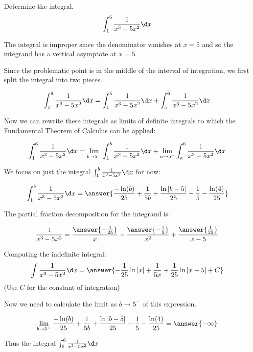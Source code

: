 \documentclass{ximera}
\author{Jason Miller}
\begin{document}
\begin{exercise}
Determine the integral.
\[
\int_{1}^{6} \frac{1}{x^3-5x^2} \d x
\]

The integral is improper since the denominator vanishes at $x=5$ and so the integrand has a vertical asymptote at $x=5$. 

Since the problematic point is in the middle of the interval of integration, we first split the integral into two pieces. 

\[
\int _{1}^{6} \frac{1}{x^3-5x^2} \d x=\int_{1}^{5} \frac{1}{x^3-5x^2} \d x + \int_{5}^{6} \frac{1}{x^3-5x^2} \d x
\]

Now we can rewrite these integrals as limits of definite integrals to which the Fundamental Theorem of Calculus can be applied: 

\[
\int_{1}^{6} \frac{1}{x^3-5x^2} \d x= \lim_{b \to 5^{-}} \int_{1}^{b} \frac{1}{x^3-5x^2} \d x + \lim_{a \to 5^{+}} \int _{a}^{6} 
\frac{1}{x^3-5x^2} \d x
\]


We focus on just the integral $\int_{1}^{b} \frac{1}{x^3-5x^2} \d x$ for now:

\[
\int_{1}^{b} \frac{1}{x^3-5x^2} \d x=\answer{  \frac{-\ln(b)}{25} +\frac{1}{5b} + \frac{\ln|b-5|}{25}-\frac{1}{5}-\frac{\ln(4)}{25}  }
\]

\begin{hint}
The partial fraction decomposition for the integrand is:

\[
\frac{1}{x^3-5x^2} = \frac{\answer{-\frac{1}{25}}}{x}+ \frac{\answer{-\frac{1}{5}}}{x^2}+\frac{\answer{\frac{1}{25}}}{x-5}
\]
\begin{question}
Computing the indefinite integral:
\[
\int \frac{1}{x^3-5x^2} \d x = \answer{-\frac{1}{25} \ln|x| + \frac{1}{5x} +\frac{1}{25} \ln|x-5|+C}
\]
(Use $C$ for the constant of integration)
\end{question}
\end{hint}

\begin{exercise}
Now we need to calculate the limit as $b \to 5^{-}$ of this expression. 

\[
\lim_{b \to 5^{-}}  \frac{-\ln(b)}{25} +\frac{1}{5b} + \frac{\ln|b-5|}{25}-\frac{1}{5}-\frac{\ln(4)}{25} =\answer{ -\infty}
\]

\begin{exercise}
Thus the integral $\int_{5}^{6} \frac{1}{x^3-5x^2} \d x$

\begin{multipleChoice}
\end{multipleChoice}


\end{exercise}
\end{exercise}
\end{exercise}
\end{document}
